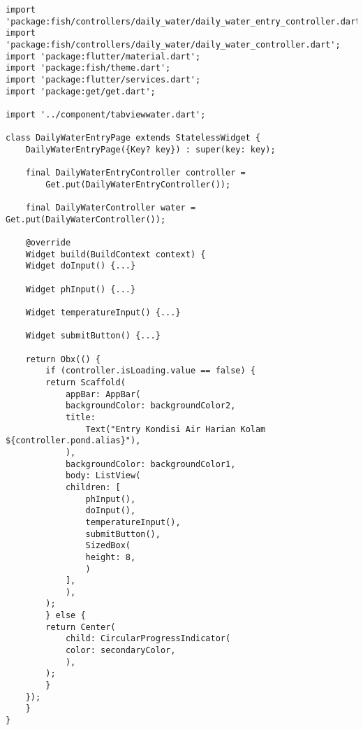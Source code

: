 	\begin{lstlisting}
import 'package:fish/controllers/daily_water/daily_water_entry_controller.dart';
import 'package:fish/controllers/daily_water/daily_water_controller.dart';
import 'package:flutter/material.dart';
import 'package:fish/theme.dart';
import 'package:flutter/services.dart';
import 'package:get/get.dart';

import '../component/tabviewwater.dart';

class DailyWaterEntryPage extends StatelessWidget {
    DailyWaterEntryPage({Key? key}) : super(key: key);

    final DailyWaterEntryController controller =
        Get.put(DailyWaterEntryController());

    final DailyWaterController water = Get.put(DailyWaterController());

    @override
    Widget build(BuildContext context) {
    Widget doInput() {...}

    Widget phInput() {...}

    Widget temperatureInput() {...}

    Widget submitButton() {...}

    return Obx(() {
        if (controller.isLoading.value == false) {
        return Scaffold(
            appBar: AppBar(
            backgroundColor: backgroundColor2,
            title:
                Text("Entry Kondisi Air Harian Kolam ${controller.pond.alias}"),
            ),
            backgroundColor: backgroundColor1,
            body: ListView(
            children: [
                phInput(),
                doInput(),
                temperatureInput(),
                submitButton(),
                SizedBox(
                height: 8,
                )
            ],
            ),
        );
        } else {
        return Center(
            child: CircularProgressIndicator(
            color: secondaryColor,
            ),
        );
        }
    });
    }
}        
	\end{lstlisting}

